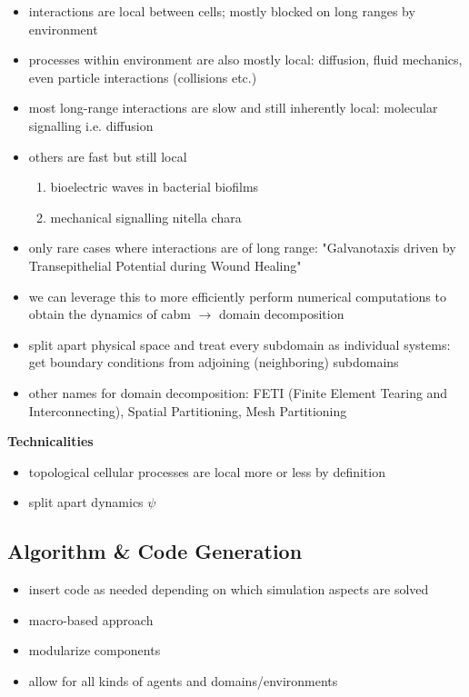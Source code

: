 \begin{itemize}
    \item interactions are local between cells; mostly blocked on long ranges by environment
    \item processes within environment are also mostly local: diffusion, fluid mechanics, even
        particle interactions (collisions etc.)
    \item most long-range interactions are slow and still inherently local: molecular signalling
        i.e. diffusion
    \item others are fast but still local
    \begin{enumerate}
        \item bioelectric waves in bacterial biofilms \cite{Prindle2015}
        \item mechanical signalling nitella chara \cite{Shimmen1997}
    \end{enumerate}
    \item only rare cases where interactions are of long range: "Galvanotaxis driven by
        Transepithelial Potential during Wound Healing" \cite{duBoisReymond1843,Zhao2006}
    \item we can leverage this to more efficiently perform numerical computations to obtain the
        dynamics of \ac{cabm} $\rightarrow$ domain decomposition
    \item split apart physical space and treat every subdomain as individual systems: get boundary
        conditions from adjoining (neighboring) subdomains
    \item other names for domain decomposition: FETI (Finite Element Tearing and Interconnecting),
        Spatial Partitioning, Mesh Partitioning
\end{itemize}

\textbf{Technicalities}
\begin{itemize}
    \item topological cellular processes are local more or less by definition
    \item split apart dynamics $\psi$
\end{itemize}

\subsection{Algorithm \& Code Generation}
\begin{itemize}
    \item insert code as needed depending on which simulation aspects are solved
    \item macro-based approach
    \item modularize components
    \item allow for all kinds of agents and domains/environments
\end{itemize}

